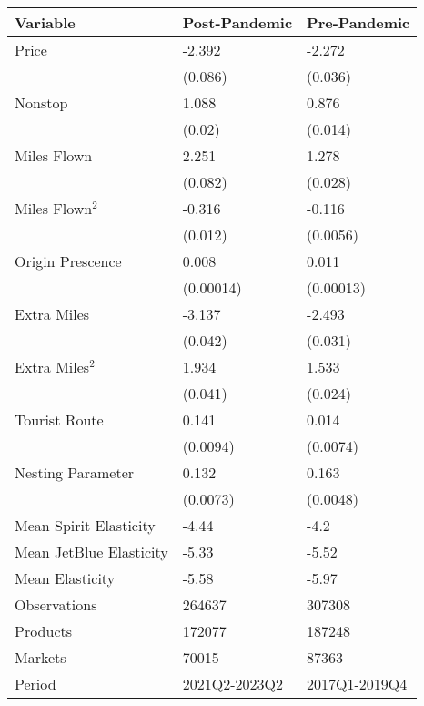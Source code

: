 
\begin{tabular}[t]{lll}
\toprule
Variable & Post-Pandemic & Pre-Pandemic\\
\midrule
Price & -2.392 & -2.272\\
 & (0.086) & (0.036)\\
Nonstop & 1.088 & 0.876\\
 & (0.02) & (0.014)\\
Miles Flown & 2.251 & 1.278\\
 & (0.082) & (0.028)\\
Miles Flown$^2$ & -0.316 & -0.116\\
 & (0.012) & (0.0056)\\
Origin Prescence & 0.008 & 0.011\\
 & (0.00014) & (0.00013)\\
Extra Miles & -3.137 & -2.493\\
 & (0.042) & (0.031)\\
Extra Miles$^2$ & 1.934 & 1.533\\
 & (0.041) & (0.024)\\
Tourist Route & 0.141 & 0.014\\
 & (0.0094) & (0.0074)\\
\midrule
Nesting Parameter & 0.132 & 0.163\\
 & (0.0073) & (0.0048)\\
Mean Spirit Elasticity & -4.44 & -4.2\\
Mean JetBlue Elasticity & -5.33 & -5.52\\
Mean Elasticity & -5.58 & -5.97\\
Observations & 264637 & 307308\\
Products & 172077 & 187248\\
Markets & 70015 & 87363\\
Period & 2021Q2-2023Q2 & 2017Q1-2019Q4\\
\bottomrule
\end{tabular}
